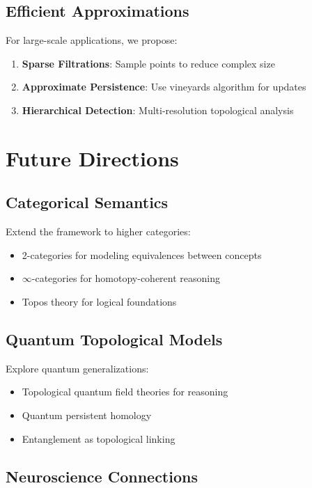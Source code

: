 \documentclass[11pt]{article}
\begin{document}
\subsection{Efficient Approximations}

For large-scale applications, we propose:

\begin{enumerate}
    \item \textbf{Sparse Filtrations}: Sample points to reduce complex size
    \item \textbf{Approximate Persistence}: Use vineyards algorithm for updates
    \item \textbf{Hierarchical Detection}: Multi-resolution topological analysis
\end{enumerate}

\section{Future Directions}

\subsection{Categorical Semantics}

Extend the framework to higher categories:
\begin{itemize}
    \item 2-categories for modeling equivalences between concepts
    \item $\infty$-categories for homotopy-coherent reasoning
    \item Topos theory for logical foundations
\end{itemize}

\subsection{Quantum Topological Models}

Explore quantum generalizations:
\begin{itemize}
    \item Topological quantum field theories for reasoning
    \item Quantum persistent homology
    \item Entanglement as topological linking
\end{itemize}

\subsection{Neuroscience Connections}
\end{document}
